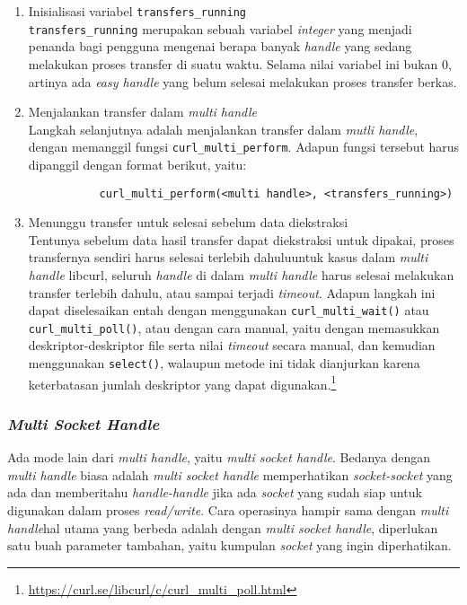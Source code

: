 \begin{enumerate}
	\item Inisialisasi variabel \verb|transfers_running|\\
	\verb|transfers_running| merupakan sebuah variabel \textit{integer} yang menjadi penanda bagi pengguna mengenai berapa banyak \textit{handle} yang sedang melakukan proses transfer di suatu waktu. Selama nilai variabel ini bukan 0, artinya ada \textit{easy handle} yang belum selesai melakukan proses transfer berkas.
	\item Menjalankan transfer dalam \textit{multi handle}\\
	Langkah selanjutnya adalah menjalankan transfer dalam \textit{mutli handle}, dengan memanggil fungsi \verb|curl_multi_perform|. Adapun fungsi tersebut harus dipanggil dengan format berikut, yaitu:

\begin{verbatim}
           curl_multi_perform(<multi handle>, <transfers_running>)
\end{verbatim}

	\item Menunggu transfer untuk selesai sebelum data diekstraksi\\
	Tentunya sebelum data hasil transfer dapat diekstraksi untuk dipakai, proses transfernya sendiri harus selesai terlebih dahulu\textemdash untuk kasus dalam \textit{multi handle} libcurl, seluruh \textit{handle} di dalam \textit{multi handle} harus selesai melakukan transfer terlebih dahulu, atau sampai terjadi \textit{timeout}. Adapun langkah ini dapat diselesaikan entah dengan menggunakan \verb|curl_multi_wait()| atau \verb|curl_multi_poll()|, atau dengan cara manual, yaitu dengan memasukkan deskriptor-deskriptor file serta nilai \textit{timeout} secara manual, dan kemudian menggunakan \verb|select()|, walaupun metode ini tidak dianjurkan karena keterbatasan jumlah deskriptor yang dapat digunakan.\footnote{\href{https://curl.se/libcurl/c/curl\_multi\_poll.html}{https://curl.se/libcurl/c/curl\_multi\_poll.html}}
\end{enumerate}

\subsubsection{\textit{Multi Socket Handle}}
\label{sec:cmodules-libcurl-handlemultisocket}

Ada mode lain dari \textit{multi handle}, yaitu \textit{multi socket handle}. Bedanya dengan \textit{multi handle} biasa adalah \textit{multi socket handle} memperhatikan \textit{socket-socket} yang ada dan memberitahu \textit{handle-handle} jika ada \textit{socket} yang sudah siap untuk digunakan dalam proses \textit{read/write}. Cara operasinya hampir sama dengan \textit{multi handle}\textemdash hal utama yang berbeda adalah dengan \textit{multi socket handle}, diperlukan satu buah parameter tambahan, yaitu kumpulan \textit{socket} yang ingin diperhatikan.

